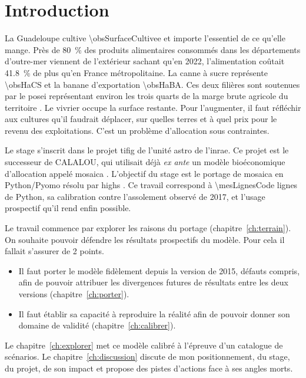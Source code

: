 \chapter*{Introduction}

La Guadeloupe cultive \SI{\obsSurfaceCultivee}{\ha} et importe l'essentiel de ce qu'elle mange.
Près de \SI{80}{\percent} des produits alimentaires consommés dans les départements d'outre-mer
viennent de l'extérieur \parencite{viepublique2023,odeadom2019} sachant qu'en 2022, l'alimentation coûtait
\SI{41.8}{\percent} de plus qu'en France métropolitaine. La canne à sucre représente \SI{\obsHaCS}{\ha} et la banane d'exportation
\SI{\obsHaBA}{\ha}. Ces deux filières sont soutenues par le \gls{posei} représentant environ les trois quarts
de la marge brute agricole du territoire \parencite{touteleurope2024}. Le vivrier occupe la surface
restante. Pour l'augmenter, il faut réfléchir aux cultures qu'il faudrait déplacer, sur quelles
terres et à quel prix pour le revenu des exploitations. C'est un problème d'allocation sous
contraintes.

Le stage s'inscrit dans le projet \gls{tifig} de l'unité \gls{astro} de l'\gls{inrae}. Ce projet est le successeur
de CALALOU, qui utilisait déjà \emph{ex ante} un modèle bioéconomique
d'allocation appelé \gls{mosaica} \parencite{chopin2015}. L'objectif du stage est le portage de \gls{mosaica} en Python/Pyomo
\parencite{pyomo2021} résolu par \gls{highs} \parencite{highs2018}. Ce travail correspond 
à \num{\mesLignesCode} lignes de Python, sa calibration contre l'assolement
observé de 2017, et l'usage prospectif qu'il rend enfin possible.

Le travail commence par explorer les raisons du portage (chapitre~\ref{ch:terrain}).
On souhaite pouvoir défendre les résultats prospectifs du modèle. Pour cela il fallait
s'assurer de \num{2} points.

\begin{itemize}[leftmargin=1.2em,itemsep=3pt]
  \item Il faut porter le modèle fidèlement depuis la version de 2015, défauts compris, afin
    de pouvoir attribuer les divergences futures de résultats entre les deux versions
    (chapitre~\ref{ch:porter}).
  \item Il faut établir sa capacité à reproduire la réalité afin de pouvoir donner son domaine
    de validité (chapitre~\ref{ch:calibrer}).
\end{itemize}

Le chapitre~\ref{ch:explorer} met ce modèle calibré à l'épreuve d'un catalogue de scénarios.
Le chapitre~\ref{ch:discussion} discute de mon positionnement, du stage, du projet,
de son impact et propose des pistes d'actions face à ses angles morts.
